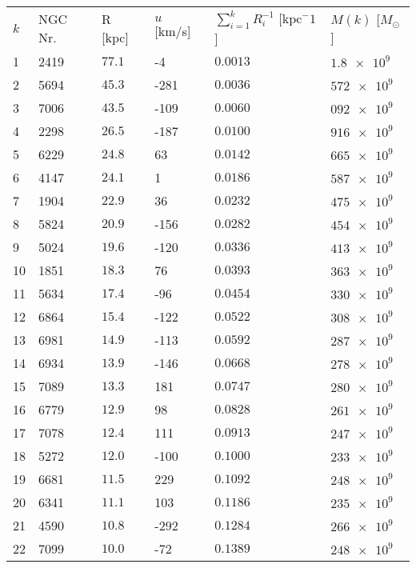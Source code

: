 \documentclass[a4paper,german,12pt,smallheadings]{scrartcl}
\begin{document}
\begin{enumerate}[a)]
    \begin{longtable}{|l|l|l|l|l|l|}
    \hline
    $k$  & NGC Nr. &R [kpc] & $u$ [km/s] & $\sum_{i=1}^k R_i^{-1}$
    [$\mathrm{kpc}^-1$] & $M(k)$ [$M_\odot$] \\
     1 & 2419 & $\num{77.1}$ & -4   & $\num{0.0013}$ & $\num{1.8e9}$ \\
     2 & 5694 & $\num{45.3}$ & -281 & $\num{0.0036}$ & $\num{572e9}$ \\
     3 & 7006 & $\num{43.5}$ & -109 & $\num{0.0060}$ & $\num{092e9}$ \\
     4 & 2298 & $\num{26.5}$ & -187 & $\num{0.0100}$ & $\num{916e9}$ \\
     5 & 6229 & $\num{24.8}$ & 63   & $\num{0.0142}$ & $\num{665e9}$ \\
     6 & 4147 & $\num{24,1}$ & 1    & $\num{0.0186}$ & $\num{587e9}$ \\
     7 & 1904 & $\num{22.9}$ & 36   & $\num{0.0232}$ & $\num{475e9}$ \\
     8 & 5824 & $\num{20.9}$ & -156 & $\num{0.0282}$ & $\num{454e9}$ \\
     9 & 5024 & $\num{19.6}$ & -120 & $\num{0.0336}$ & $\num{413e9}$ \\
    10 & 1851 & $\num{18.3}$ & 76   & $\num{0.0393}$ & $\num{363e9}$ \\
    11 & 5634 & $\num{17.4}$ & -96  & $\num{0.0454}$ & $\num{330e9}$ \\
    12 & 6864 & $\num{15.4}$ & -122 & $\num{0.0522}$ & $\num{308e9}$ \\
    13 & 6981 & $\num{14.9}$ & -113 & $\num{0.0592}$ & $\num{287e9}$ \\
    14 & 6934 & $\num{13.9}$ & -146 & $\num{0.0668}$ & $\num{278e9}$ \\
    15 & 7089 & $\num{13.3}$ & 181  & $\num{0.0747}$ & $\num{280e9}$ \\
    16 & 6779 & $\num{12.9}$ & 98   & $\num{0.0828}$ & $\num{261e9}$ \\
    17 & 7078 & $\num{12.4}$ & 111  & $\num{0.0913}$ & $\num{247e9}$ \\
    18 & 5272 & $\num{12.0}$ & -100 & $\num{0.1000}$ & $\num{233e9}$ \\
    19 & 6681 & $\num{11.5}$ & 229  & $\num{0.1092}$ & $\num{248e9}$ \\
    20 & 6341 & $\num{11.1}$ & 103  & $\num{0.1186}$ & $\num{235e9}$ \\
    21 & 4590 & $\num{10.8}$ & -292 & $\num{0.1284}$ & $\num{266e9}$ \\
    22 & 7099 & $\num{10.0}$ & -72  & $\num{0.1389}$ & $\num{248e9}$ \\

\end{longtable}
\end{enumerate}
\end{document}
